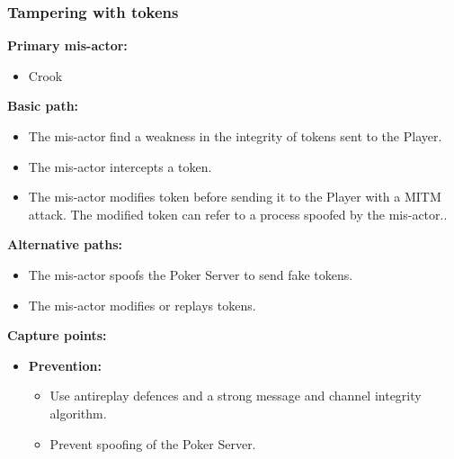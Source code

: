 \documentclass[a4paper,11pt]{report}
\begin{document}
\subsubsection{Tampering with tokens}
\textbf{Primary mis-actor:}
\begin{itemize}
\item Crook
\end{itemize}
\textbf{Basic path:}
\begin{itemize}
\item The mis-actor find a weakness in the integrity of tokens sent to the Player.
\item The mis-actor intercepts a token.
\item The mis-actor modifies token before sending it to the Player with a MITM attack. The modified token can refer to a process spoofed by the mis-actor..
\end{itemize}
\textbf{Alternative paths:}
\begin{itemize}
\item The mis-actor spoofs the Poker Server to send fake tokens.
\item The mis-actor modifies or replays tokens.
\end{itemize}
\textbf{Capture points:}
\begin{itemize}
\item \textbf{Prevention:}
\begin{itemize}
\item Use antireplay defences and a strong message and channel integrity algorithm.
\item Prevent spoofing of the Poker Server.
\end{itemize}
\end{itemize}
\end{document}
